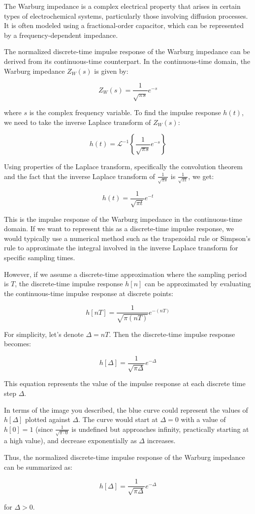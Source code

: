 The Warburg impedance is a complex electrical property that arises in certain types of electrochemical systems, particularly those involving diffusion processes. It is often modeled using a fractional-order capacitor, which can be represented by a frequency-dependent impedance.

The normalized discrete-time impulse response of the Warburg impedance can be derived from its continuous-time counterpart. In the continuous-time domain, the Warburg impedance \( Z_W(s) \) is given by:

\[ Z_W(s) = \frac{1}{\sqrt{\pi s}} e^{-s} \]

where \( s \) is the complex frequency variable. To find the impulse response \( h(t) \), we need to take the inverse Laplace transform of \( Z_W(s) \):

\[ h(t) = \mathcal{L}^{-1}\left\{ \frac{1}{\sqrt{\pi s}} e^{-s} \right\} \]

Using properties of the Laplace transform, specifically the convolution theorem and the fact that the inverse Laplace transform of \( \frac{1}{\sqrt{\pi s}} \) is \( \frac{1}{\sqrt{\pi t}} \), we get:

\[ h(t) = \frac{1}{\sqrt{\pi t}} e^{-t} \]

This is the impulse response of the Warburg impedance in the continuous-time domain. If we want to represent this as a discrete-time impulse response, we would typically use a numerical method such as the trapezoidal rule or Simpson's rule to approximate the integral involved in the inverse Laplace transform for specific sampling times.

However, if we assume a discrete-time approximation where the sampling period is \( T \), the discrete-time impulse response \( h[n] \) can be approximated by evaluating the continuous-time impulse response at discrete points:

\[ h[nT] = \frac{1}{\sqrt{\pi (nT)}} e^{-(nT)} \]

For simplicity, let's denote \( \Delta = nT \). Then the discrete-time impulse response becomes:

\[ h[\Delta] = \frac{1}{\sqrt{\pi \Delta}} e^{-\Delta} \]

This equation represents the value of the impulse response at each discrete time step \( \Delta \).

In terms of the image you described, the blue curve could represent the values of \( h[\Delta] \) plotted against \( \Delta \). The curve would start at \( \Delta = 0 \) with a value of \( h[0] = 1 \) (since \( \frac{1}{\sqrt{\pi \cdot 0}} \) is undefined but approaches infinity, practically starting at a high value), and decrease exponentially as \( \Delta \) increases.

Thus, the normalized discrete-time impulse response of the Warburg impedance can be summarized as:

\[ h[\Delta] = \frac{1}{\sqrt{\pi \Delta}} e^{-\Delta} \]

for \( \Delta > 0 \).